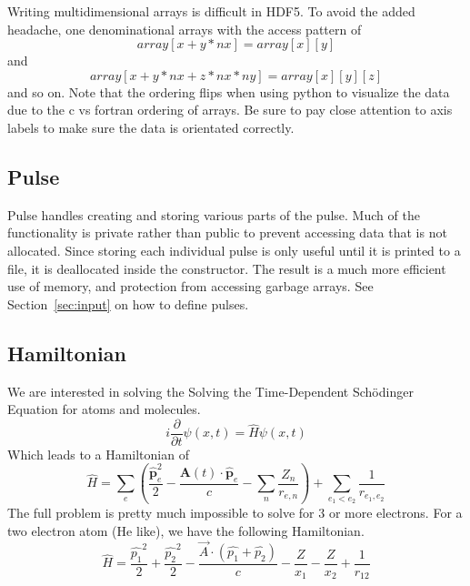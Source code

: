 \documentclass{article}
\begin{document}
Writing multidimensional arrays is difficult in HDF5. To avoid the added headache, one denominational arrays with the access pattern of
\begin{equation}
	array[x+y*nx] = array[x][y]
\end{equation}
and
\begin{equation}
	array[x+y*nx+z*nx*ny] = array[x][y][z]
\end{equation}
and so on. Note that the ordering flips when using python to visualize the data due to the c vs fortran ordering of arrays. Be sure to pay close attention to axis labels to make sure the data is orientated correctly.

\subsection{Pulse} %
\label{sub:pulse}
Pulse handles creating and storing various parts of the pulse. Much of the functionality is private rather than public to prevent accessing data that is not allocated. Since storing each individual pulse is only useful until it is printed to a file, it is deallocated inside the constructor. The result is a much more efficient use of memory, and protection from accessing garbage arrays. See Section~\ref{sec:input} on how to define pulses.

\subsection{Hamiltonian} %
\label{sub:hamiltonian}
We are interested in solving the Solving the Time-Dependent Sch\"{o}dinger Equation for atoms and molecules.
\begin{equation}
    i\frac{\partial}{\partial t}\psi(x,t) = \hat{H}\psi(x,t)
\end{equation}
Which leads to a Hamiltonian of
\begin{equation}
    \hat{H} = \sum_{e}\left(\frac{\hat{\mathbf{p}}^2_e}{2} - \frac{\mathbf{A}(t) \cdot \hat{\mathbf{p}}_e}{c} - \sum_{n} \frac{Z_n}{r_{e,n}}\right) + \sum_{e_1 < e_2}\frac{1}{r_{e_1, e_2}}
\end{equation}
The full problem is pretty much impossible to solve for 3 or more electrons. For a two electron atom (He like), we have the following Hamiltonian.
\begin{equation}
  \hat H = \frac{\hat{p_1}^2}{2} + \frac{\hat{p_2}^2}{2} - \frac{\vec{A} \cdot (\hat{p_1}+\hat{p_2})}{c} - \frac{Z}{x_1} - \frac{Z}{x_2} + \frac{1}{r_{12}}
\end{equation}
\end{document}
